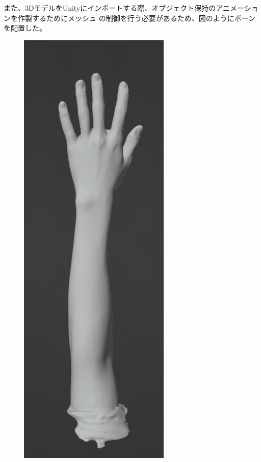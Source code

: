 \documentclass{ltjsreport}
\begin{document}
		また、3DモデルをUnityにインポートする際、オブジェクト保持のアニメーションを作製するためにメッシュ
		の制御を行う必要があるため、図のようにボーンを配置した。
		\begin{figure}[H]
		\centering
		\begin{minipage}{0.15\columnwidth}
		\centering
		\includegraphics[width = \columnwidth]{../figs/handmeshAll.png}

\end{minipage}
\end{figure}
\end{document}
